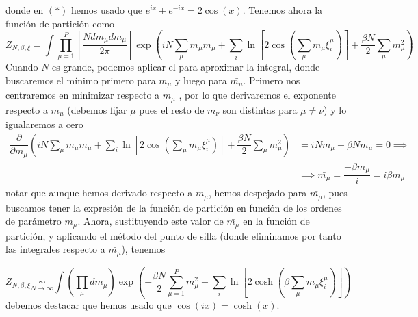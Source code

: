 donde en $(*)$ hemos usado que $e^{ix} + e^{-ix} = 2 \cos(x)$. Tenemos ahora la función de partición como
\begin{equation}
    Z_{N,\beta,\xi} = \int \prod_{\mu=1}^{P} \left[\dfrac{Ndm_{\mu}d\bar{m_{\mu}}}{2\pi}\right] \exp\left( iN \sum_{\mu} \bar{m_{\mu}} m_{\mu} + \sum_i\ln \left[ 2 \cos\left( \sum_{\mu} \bar{m}_{\mu} \xi_i^{\mu} \right) \right] + \dfrac{\beta N}{2} \sum_{\mu} m_\mu^2 \right) \quad \label{eq:particion_hopfield}
\end{equation}
Cuando $N$ es grande, podemos aplicar el  para aproximar la integral, donde buscaremos el mínimo primero para $m_{\mu}$ y luego para $\bar{m_{\mu}}$. Primero nos centraremos en minimizar respecto a $m_{\mu}$ , por lo que derivaremos el exponente respecto a $m_{\mu}$ (debemos fijar $\mu$ pues el resto de $m_{\nu}$ son distintas para $\mu\neq \nu$) y lo igualaremos a cero
\begin{align*}
    \dfrac{\partial}{\partial m_{\mu}} \left( iN \sum_{\mu} \bar{m_{\mu}} m_{\mu} + \sum_i\ln \left[ 2 \cos\left( \sum_{\mu} \bar{m}_{\mu} \xi_i^{\mu} \right) \right] + \dfrac{\beta N}{2} \sum_{\mu} m_\mu^2 \right) &= iN \bar{m_{\mu}} + \beta N m_{\mu} = 0 \implies \\
    & \implies \bar{m_{\mu}} = \dfrac{-\beta m_{\mu}}{i}= i \beta m_{\mu}
\end{align*}
notar que aunque hemos derivado respecto a $m_{\mu}$, hemos despejado para $\bar{m_{\mu}}$, pues buscamos tener la expresión de la función de partición en función de los ordenes de parámetro $m_{\mu}$. Ahora, sustituyendo este valor de $\bar{m_{\mu}}$ en la función de partición, y aplicando el método del punto de silla (donde eliminamos por tanto las integrales respecto a $\bar{m_{\mu}}$), tenemos

\begin{equation*}
    Z_{N,\beta,\xi} \underset{N \to \infty}{\sim} \int \left( \prod_{\mu} dm_\mu \right) \exp \left( -\frac{\beta N}{2} \sum_{\mu=1}^P m_\mu^2 + \sum_{i} \ln \left[ 2 \cosh \left( \beta \sum_{\mu} m_\mu \xi_i^\mu \right) \right] \right)
\end{equation*}
debemos destacar que hemos usado que $\cos(ix) = \cosh(x)$.\\


